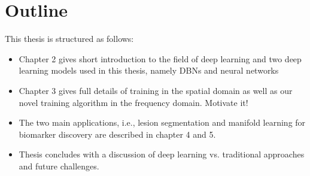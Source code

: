 \section{Outline}

This thesis is structured as follows:
\begin{itemize}
\item Chapter 2 gives short introduction to the field of deep learning and two
deep learning models used in this thesis, namely DBNs and neural networks
\item Chapter 3 gives full details of training in the spatial domain as well as
our novel training algorithm in the frequency domain. Motivate it!
\item The two main applications, i.e., lesion segmentation and manifold learning
for biomarker discovery are described in chapter 4 and 5.
\item Thesis concludes with a discussion of deep learning vs. traditional
approaches and future challenges.
\end{itemize}



